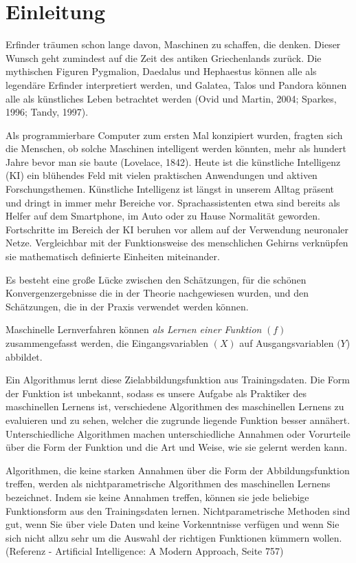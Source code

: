 \chapter*{Einleitung}

Erfinder träumen schon lange davon, Maschinen zu schaffen, die denken. Dieser Wunsch geht zumindest auf die Zeit des antiken Griechenlands zurück. Die mythischen Figuren Pygmalion, Daedalus und Hephaestus können alle als legendäre Erfinder interpretiert werden, und Galatea, Talos und Pandora können alle als künstliches Leben betrachtet werden (Ovid und Martin, 2004; Sparkes, 1996; Tandy, 1997).

Als programmierbare Computer zum ersten Mal konzipiert wurden, fragten sich die Menschen, ob solche Maschinen intelligent werden könnten, mehr als hundert Jahre bevor man sie baute (Lovelace, 1842). Heute ist die künstliche Intelligenz (KI) ein blühendes Feld mit vielen praktischen Anwendungen und aktiven Forschungsthemen. 
Künstliche Intelligenz ist längst in unserem Alltag präsent und dringt in immer mehr Bereiche vor. Sprachassistenten etwa sind bereits als Helfer auf dem Smartphone, im Auto oder zu Hause Normalität geworden. Fortschritte im Bereich der KI beruhen vor allem auf der Verwendung neuronaler Netze. Vergleichbar mit der Funktionsweise des menschlichen Gehirns verknüpfen sie mathematisch definierte Einheiten miteinander.

Es besteht eine große Lücke zwischen den Schätzungen, für die schönen Konvergenzergebnisse die in der Theorie nachgewiesen wurden, und den Schätzungen, die in der Praxis verwendet werden können.

Maschinelle Lernverfahren können \emph{als Lernen einer Funktion} $(f)$ zusammengefasst werden, die Eingangsvariablen $(X)$ auf Ausgangsvariablen $(Y$) abbildet.

Ein Algorithmus lernt diese Zielabbildungsfunktion aus Trainingsdaten.
Die Form der Funktion ist unbekannt, sodass es unsere Aufgabe als Praktiker des maschinellen Lernens ist, verschiedene Algorithmen des maschinellen Lernens zu evaluieren und zu sehen, welcher die zugrunde liegende Funktion besser annähert.
Unterschiedliche Algorithmen machen unterschiedliche Annahmen oder Vorurteile über die Form der Funktion und die Art und Weise, wie sie gelernt werden kann.

Algorithmen, die keine starken Annahmen über die Form der Abbildungsfunktion treffen, werden als nichtparametrische Algorithmen des maschinellen Lernens bezeichnet. Indem sie keine Annahmen treffen, können sie jede beliebige Funktionsform aus den Trainingsdaten lernen.
Nichtparametrische Methoden sind gut, wenn Sie über viele Daten und keine Vorkenntnisse verfügen und wenn Sie sich nicht allzu sehr um die Auswahl der richtigen Funktionen kümmern wollen. (Referenz - Artificial Intelligence: A Modern Approach, Seite 757)

